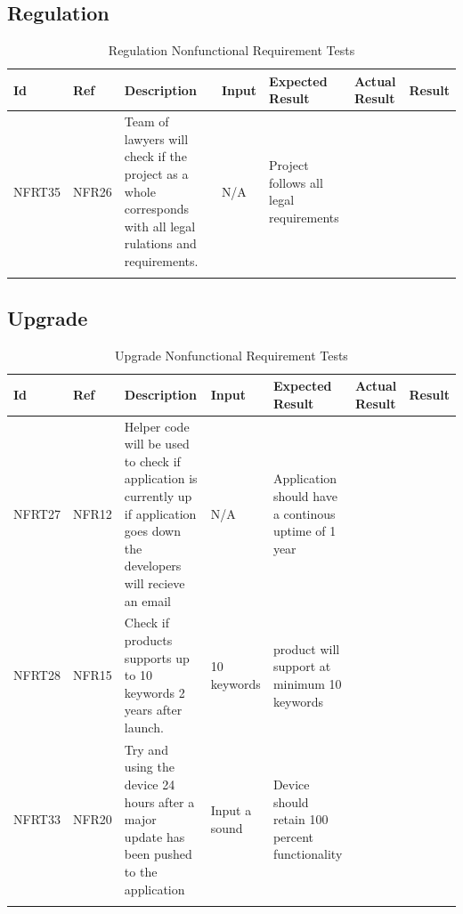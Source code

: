 \documentclass[12pt, titlepage]{article}
\begin{document}
\subsection{Regulation}

\begin{longtable}{|p{1.4cm}|p{1.4cm}|p{3cm}|p{1.5cm}|p{2.5cm}|p{2cm}|p{1.2cm}|}

  \endfirsthead
  \endhead
  \hline
  \textbf{Id} & \textbf{Ref} & \textbf{Description}                                                         & \textbf{Input}                                    & \textbf{Expected Result}    & \textbf{Actual Result}                          & \textbf{Result}                                     \\ \hline
  NFRT35        & NFR26          & Team of lawyers will check if the project as a whole corresponds with all legal rulations and requirements.                & N/A         & Project follows all legal requirements           &          & \cellcolor[HTML]{FFFFFF}{\color[HTML]{F8A102} TBD}                        \\ \hline
  \caption{Regulation Nonfunctional Requirement Tests}
  \label{RegulationNonfunctionalRequirementTests}
\end{longtable}

\subsection{Upgrade}

\begin{longtable}{|p{1.4cm}|p{1.4cm}|p{3cm}|p{1.5cm}|p{2.5cm}|p{2cm}|p{1.2cm}|}
  \endfirsthead
  \endhead
  \hline
  \textbf{Id} & \textbf{Ref} & \textbf{Description}                                                         & \textbf{Input}                                    & \textbf{Expected Result}    & \textbf{Actual Result}                          & \textbf{Result}                                     \\ \hline
  NFRT27        & NFR12          & Helper code will be used to check if application is currently up if application goes down the developers will recieve an email              & N/A         & Application should have a continous uptime of 1 year         &       & \cellcolor[HTML]{FFFFFF}{\color[HTML]{F8A102} TBD}                        \\ \hline
  NFRT28        & NFR15          & Check if products supports up to 10 keywords 2 years after launch.              & 10 keywords         & product will support at minimum 10 keywords         &       & \cellcolor[HTML]{FFFFFF}{\color[HTML]{F8A102} TBD}                        \\ \hline
  NFRT33        & NFR20          & Try and using the device 24 hours after a major update has been pushed to the application              & Input a sound         & Device should retain 100 percent functionality         &       & \cellcolor[HTML]{FFFFFF}{\color[HTML]{F8A102} TBD}                        \\ \hline
  \caption{Upgrade Nonfunctional Requirement Tests}
  \label{UpgradeNonfunctionalRequirementTests}
\end{longtable}
\end{document}
